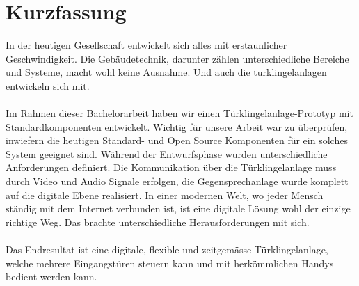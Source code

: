 \section*{Kurzfassung}
\label{sec:zusammenfassung}

In der heutigen Gesellschaft entwickelt sich alles mit erstaunlicher Geschwindigkeit. Die Gebäudetechnik, darunter zählen unterschiedliche Bereiche und Systeme, macht wohl keine Ausnahme. Und auch die \gls{turklingelanlage}n entwickeln sich mit.
\\
\\
Im Rahmen dieser Bachelorarbeit haben wir einen Türklingelanlage-Prototyp mit Standardkomponenten entwickelt. Wichtig für unsere Arbeit war zu überprüfen, inwiefern die heutigen Standard- und Open Source Komponenten für ein solches System geeignet sind. Während der Entwurfsphase wurden unterschiedliche Anforderungen definiert. Die Kommunikation über die Türklingelanlage muss durch Video und Audio Signale erfolgen, die Gegensprechanlage wurde komplett auf die digitale Ebene realisiert. In einer modernen Welt, wo jeder Mensch ständig mit dem Internet verbunden ist, ist eine digitale Lösung wohl der einzige richtige Weg. Das brachte unterschiedliche Herausforderungen mit sich.
\\
\\
Das Endresultat ist eine digitale, flexible und zeitgemässe Türklingelanlage, welche mehrere Eingangstüren steuern kann und mit herkömmlichen Handys bedient werden kann. 
